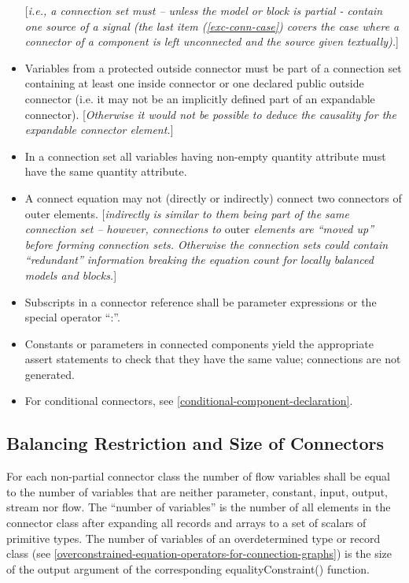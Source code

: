 \documentclass[10pt,a4paper]{report}
\def\doublelabel#1{\label{#1}}
\begin{document}
\begin{itemize}
\begin{enumerate}
\end{enumerate}
{[}\emph{i.e., a connection set must -- unless the model or block is partial -
  contain one source of a signal (the last item (\ref{exc-conn-case}) covers the case
  where a connector of a component is left unconnected and the source
  given textually).}{]}
\item
  Variables from a protected outside connector must be part of a
  connection set containing at least one inside connector or one
  declared public outside connector (i.e. it may not be an implicitly
  defined part of an expandable connector). {[}\emph{Otherwise it would
  not be possible to deduce the causality for the expandable connector
  element.}{]}
\item
  In a connection set all variables having non-empty quantity attribute
  must have the same quantity attribute.
\item
  A connect equation may not (directly or indirectly) connect two
  connectors of outer elements. {[}\emph{indirectly is similar to them
  being part of the same connection set -- however, connections to}
  outer \emph{elements are ``moved up'' before forming connection sets.
  Otherwise the connection sets could contain ``redundant'' information
  breaking the equation count for locally balanced models and
  blocks.}{]}
\item
  Subscripts in a connector reference shall be parameter expressions or
  the special operator ``:''.
\item
  Constants or parameters in connected components yield the appropriate
  assert statements to check that they have the same value; connections
  are not generated.
\item
  For conditional connectors, see \ref{conditional-component-declaration}.
\end{itemize}

\subsection{Balancing Restriction and Size of Connectors}\doublelabel{balancing-restriction-and-size-of-connectors}

For each non-partial connector class the number of flow variables shall
be equal to the number of variables that are neither parameter,
constant, input, output, stream nor flow. The ``number of variables'' is
the number of all elements in the connector class after expanding all
records and arrays to a set of scalars of primitive types. The number of
variables of an overdetermined type or record class (see \ref{overconstrained-equation-operators-for-connection-graphs})
is the size of the output argument of the corresponding
equalityConstraint() function.
\end{document}
